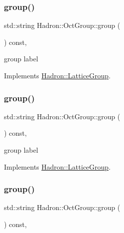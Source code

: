 \subsubsection{\texorpdfstring{group()}{group()}\hspace{0.1cm}{\footnotesize\ttfamily [1/3]}}
{\footnotesize\ttfamily std\+::string Hadron\+::\+Oct\+Group\+::group (\begin{DoxyParamCaption}{ }\end{DoxyParamCaption}) const\hspace{0.3cm}{\ttfamily [inline]}, {\ttfamily [virtual]}}

group label 

Implements \mbox{\hyperlink{structHadron_1_1LatticeGroup_a82208a322bf1b1db489f16af38e70087}{Hadron\+::\+Lattice\+Group}}.

\mbox{\label{structHadron_1_1OctGroup_a0d21b9bbc5cc2cafa4945e9dd5608a6b}} 
\subsubsection{\texorpdfstring{group()}{group()}\hspace{0.1cm}{\footnotesize\ttfamily [2/3]}}
{\footnotesize\ttfamily std\+::string Hadron\+::\+Oct\+Group\+::group (\begin{DoxyParamCaption}{ }\end{DoxyParamCaption}) const\hspace{0.3cm}{\ttfamily [inline]}, {\ttfamily [virtual]}}

group label 

Implements \mbox{\hyperlink{structHadron_1_1LatticeGroup_a82208a322bf1b1db489f16af38e70087}{Hadron\+::\+Lattice\+Group}}.

\mbox{\label{structHadron_1_1OctGroup_a0d21b9bbc5cc2cafa4945e9dd5608a6b}} 
\subsubsection{\texorpdfstring{group()}{group()}\hspace{0.1cm}{\footnotesize\ttfamily [3/3]}}
{\footnotesize\ttfamily std\+::string Hadron\+::\+Oct\+Group\+::group (\begin{DoxyParamCaption}{ }\end{DoxyParamCaption}) const\hspace{0.3cm}{\ttfamily [inline]}, {\ttfamily [virtual]}}

